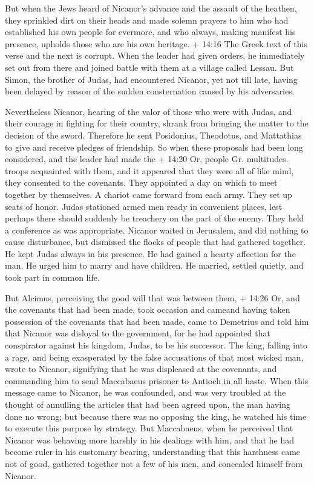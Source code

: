  But when the Jews heard of Nicanor's advance and the
assault of the heathen, they sprinkled dirt on their heads and made
solemn prayers to him who had established his own people for evermore,
and who always, making manifest his presence, upholds those who are his
own heritage.  + 14:16 The Greek text of this verse and the
next is corrupt. When the leader had given orders, he immediately set
out from there and joined battle with them at a village called Lessau.
 But Simon, the brother of Judas, had encountered Nicanor,
yet not till late, having been delayed by reason of the sudden
consternation caused by his adversaries.

 Nevertheless Nicanor, hearing of the valor of those who
were with Judas, and their courage in fighting for their country, shrank
from bringing the matter to the decision of the sword. 
Therefore he sent Posidonius, Theodotus, and Mattathias to give and
receive pledges of friendship.  So when these proposals had
been long considered, and the leader had made the + 14:20 Or, people Gr.
multitudes. troops acquainted with them, and it appeared that they were
all of like mind, they consented to the covenants.  They
appointed a day on which to meet together by themselves. A chariot came
forward from each army. They set up seats of honor.  Judas
stationed armed men ready in convenient places, lest perhaps there
should suddenly be treachery on the part of the enemy. They held a
conference as was appropriate.  Nicanor waited in
Jerusalem, and did nothing to cause disturbance, but dismissed the
flocks of people that had gathered together.  He kept Judas
always in his presence. He had gained a hearty affection for the man.
 He urged him to marry and have children. He married,
settled quietly, and took part in common life.

 But Alcimus, perceiving the good will that was between
them, + 14:26 Or, and the covenants that had been made, took occasion
and cameand having taken possession of the covenants that had been made,
came to Demetrius and told him that Nicanor was disloyal to the
government, for he had appointed that conspirator against his kingdom,
Judas, to be his successor.  The king, falling into a rage,
and being exasperated by the false accusations of that most wicked man,
wrote to Nicanor, signifying that he was displeased at the covenants,
and commanding him to send Maccabaeus prisoner to Antioch in all haste.
 When this message came to Nicanor, he was confounded, and
was very troubled at the thought of annulling the articles that had been
agreed upon, the man having done no wrong;  but because
there was no opposing the king, he watched his time to execute this
purpose by strategy.  But Maccabaeus, when he perceived
that Nicanor was behaving more harshly in his dealings with him, and
that he had become ruler in his customary bearing, understanding that
this harshness came not of good, gathered together not a few of his men,
and concealed himself from Nicanor.

